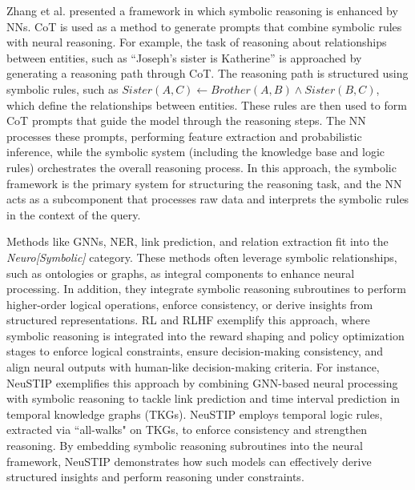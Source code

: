 \documentclass[12pt]{article}
\begin{document}
Zhang et al. \cite{zhang2022impact} presented a framework in which symbolic reasoning is enhanced by NNs. CoT is used as a method to generate prompts that combine symbolic rules with neural reasoning. For example, the task of reasoning about relationships between entities, such as “Joseph’s sister is Katherine” is approached by generating a reasoning path through CoT. The reasoning path is structured using symbolic rules, such as $Sister(A,C) \leftarrow Brother(A,B) \land Sister(B,C)$, which define the relationships between entities. These rules are then used to form CoT prompts that guide the model through the reasoning steps. The NN processes these prompts, performing feature extraction and probabilistic inference, while the symbolic system (including the knowledge base and logic rules) orchestrates the overall reasoning process. In this approach, the symbolic framework is the primary system for structuring the reasoning task, and the NN acts as a subcomponent that processes raw data and interprets the symbolic rules in the context of the query.

Methods like GNNs, NER, link prediction, and relation extraction fit into the \textit{Neuro[Symbolic]} category. These methods often leverage symbolic relationships, such as ontologies or graphs, as integral components to enhance neural processing. In addition, they integrate symbolic reasoning subroutines to perform higher-order logical operations, enforce consistency, or derive insights from structured representations. RL and RLHF exemplify this approach, where symbolic reasoning is integrated into the reward shaping and policy optimization stages to enforce logical constraints, ensure decision-making consistency, and align neural outputs with human-like decision-making criteria. For instance, NeuSTIP \cite{singh2023neustip} exemplifies this approach by combining GNN-based neural processing with symbolic reasoning to tackle link prediction and time interval prediction in temporal knowledge graphs (TKGs). NeuSTIP employs temporal logic rules, extracted via ``all-walks" on TKGs, to enforce consistency and strengthen reasoning. By embedding symbolic reasoning subroutines into the neural framework, NeuSTIP demonstrates how such models can effectively derive structured insights and perform reasoning under constraints.
\end{document}
